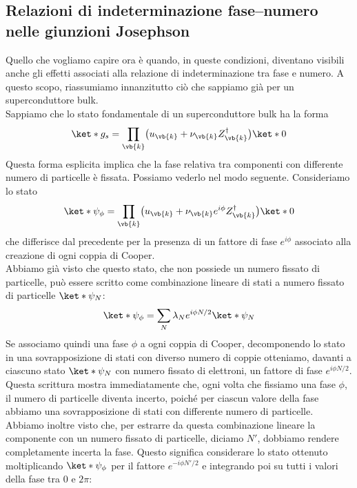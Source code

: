 \subsection{Relazioni di indeterminazione fase--numero nelle giunzioni Josephson}
Quello che vogliamo capire ora è quando, in queste condizioni, diventano visibili anche gli effetti associati alla relazione di indeterminazione tra fase e numero. A questo scopo, riassumiamo innanzitutto ciò che sappiamo già per un superconduttore bulk.\\
Sappiamo che lo stato fondamentale di un superconduttore bulk ha la forma
\begin{equation*}
    \ket*{g_s}
    =
    \prod_{\vb{k}}
    \bigl(
        u_{\vb{k}}
        +
        \nu_{\vb{k}} Z_{\vb{k}}^{\dag}
    \bigr)
    \ket*{0}
\end{equation*}
Questa forma esplicita implica che la fase relativa tra componenti con differente numero di particelle è fissata. Possiamo vederlo nel modo seguente. Consideriamo lo stato
\begin{equation*}
    \ket*{\psi_{\phi}}
    =
    \prod_{\vb{k}}
    \bigl(
        u_{\vb{k}}
        +
        \nu_{\vb{k}} e^{i\phi} Z_{\vb{k}}^{\dag}
    \bigr)
    \ket*{0}
\end{equation*}
che differisce dal precedente per la presenza di un fattore di fase $e^{i\phi}$ associato alla creazione di ogni coppia di Cooper.\\
Abbiamo già visto che questo stato, che non possiede un numero fissato di particelle, può essere scritto come combinazione lineare di stati a numero fissato di particelle $\ket*{\psi_N}$:
\begin{equation*}
    \ket*{\psi_{\phi}}
    =
    \sum_N
    \lambda_N
    e^{i\phi N/2}
    \ket*{\psi_N}
\end{equation*}
Se associamo quindi una fase $\phi$ a ogni coppia di Cooper, decomponendo lo stato in una sovrapposizione di stati con diverso numero di coppie otteniamo, davanti a ciascuno stato $\ket*{\psi_N}$ con numero fissato di elettroni, un fattore di fase $e^{i\phi N/2}$.\\
Questa scrittura mostra immediatamente che, ogni volta che fissiamo una fase $\phi$, il numero di particelle diventa incerto, poiché per ciascun valore della fase abbiamo una sovrapposizione di stati con differente numero di particelle.\\
Abbiamo inoltre visto che, per estrarre da questa combinazione lineare la componente con un numero fissato di particelle, diciamo $N'$, dobbiamo rendere completamente incerta la fase. Questo significa considerare lo stato ottenuto moltiplicando $\ket*{\psi_{\phi}}$ per il fattore $e^{-i\phi N'/2}$ e integrando poi su tutti i valori della fase tra $0$ e $2\pi$:
